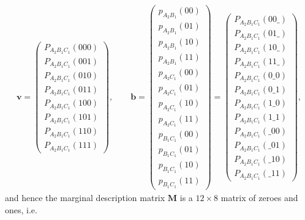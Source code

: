 \documentclass[aps,english,10pt,superscriptaddress,onecolumn,twoside,longbibliography,pra,floatfix,fleqn,nofootinbib]{revtex4-1}
\theoremstyle{definition}
\begin{document}
\begin{align}
\bm{v}=\begin{pmatrix}
 P_{A_2 B_1 C_1}(0 0 0) \\
 P_{A_2 B_1 C_1}(0 0 1) \\
 P_{A_2 B_1 C_1}(0 1 0) \\
 P_{A_2 B_1 C_1}(0 1 1) \\
 P_{A_2 B_1 C_1}(1 0 0) \\
 P_{A_2 B_1 C_1}(1 0 1) \\
 P_{A_2 B_1 C_1}(1 1 0) \\
 P_{A_2 B_1 C_1}(1 1 1)
\end{pmatrix}
,\qquad
\bm{b}=
\begin{pmatrix}
 p_{A_2 B_1}(0 0) \\
 p_{A_2 B_1}(0 1) \\
 p_{A_2 B_1}(1 0) \\
 p_{A_2 B_1}(1 1) \\
 p_{A_2 C_1}(0 0) \\
 p_{A_2 C_1}(0 1) \\
 p_{A_2 C_1}(1 0) \\
 p_{A_2 C_1}(1 1) \\
 p_{B_1 C_1}(0 0) \\
 p_{B_1 C_1}(0 1) \\
 p_{B_1 C_1}(1 0) \\
 p_{B_1 C_1}(1 1)
\end{pmatrix}=
\begin{pmatrix}
 P_{A_2 B_1 C_1}(0 0 \_) \\
 P_{A_2 B_1 C_1}(0 1 \_) \\
 P_{A_2 B_1 C_1}(1 0 \_) \\
 P_{A_2 B_1 C_1}(1 1 \_) \\
 P_{A_2 B_1 C_1}(0 \_ 0) \\
 P_{A_2 B_1 C_1}(0 \_ 1) \\
  P_{A_2 B_1 C_1}(1 \_ 0) \\
 P_{A_2 B_1 C_1}(1 \_ 1) \\
 P_{A_2 B_1 C_1}(\_ 0 0) \\
 P_{A_2 B_1 C_1}(\_ 0 1) \\
 P_{A_2 B_1 C_1}(\_ 1 0) \\
 P_{A_2 B_1 C_1}(\_ 1 1) 
\end{pmatrix},
\end{align}
and hence the marginal description matrix $\bm{M}$ is a $12\times 8$ matrix of zeroes and ones, i.e.
\end{document}
